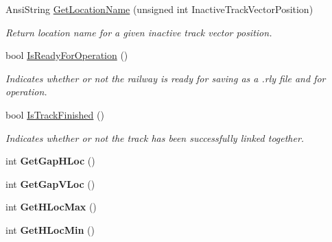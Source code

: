\begin{DoxyCompactItemize}
\item 
\mbox{\label{class_t_track_a2e0511d60228cefd27d9a52b8dd3cba4}} 
Ansi\+String \mbox{\hyperlink{class_t_track_a2e0511d60228cefd27d9a52b8dd3cba4}{Get\+Location\+Name}} (unsigned int Inactive\+Track\+Vector\+Position)
\begin{DoxyCompactList}\small\item\em Return location name for a given inactive track vector position. \end{DoxyCompactList}\item 
\mbox{\label{class_t_track_a853f6bc248fd0acdf4afe8a5f6c54251}} 
bool \mbox{\hyperlink{class_t_track_a853f6bc248fd0acdf4afe8a5f6c54251}{Is\+Ready\+For\+Operation}} ()
\begin{DoxyCompactList}\small\item\em Indicates whether or not the railway is ready for saving as a \textquotesingle{}.rly\textquotesingle{} file and for operation. \end{DoxyCompactList}\item 
\mbox{\label{class_t_track_aa8386109483977bfaa97909747358149}} 
bool \mbox{\hyperlink{class_t_track_aa8386109483977bfaa97909747358149}{Is\+Track\+Finished}} ()
\begin{DoxyCompactList}\small\item\em Indicates whether or not the track has been successfully linked together. \end{DoxyCompactList}\item 
\mbox{\label{class_t_track_a400d338422973dd209eb14ba2f621617}} 
int {\bfseries Get\+Gap\+H\+Loc} ()
\item 
\mbox{\label{class_t_track_a365d1f33d669f7a85c0c5b583e37ef43}} 
int {\bfseries Get\+Gap\+V\+Loc} ()
\item 
\mbox{\label{class_t_track_a750354d5deccaf7ccdbe8afe8f0f8e35}} 
int {\bfseries Get\+H\+Loc\+Max} ()
\item 
\mbox{\label{class_t_track_a5d25871e34f26d3c4c878fd4707ed375}} 
int {\bfseries Get\+H\+Loc\+Min} ()
\item 

\end{DoxyCompactItemize}

